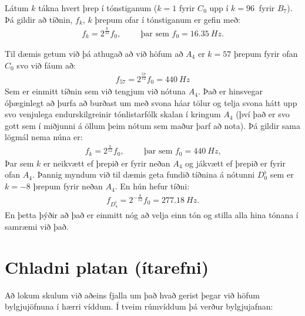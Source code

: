\begin{tcolorbox}
\begin{theorem}
Látum $k$ tákna hvert þrep í tónstiganum ($k = 1$ fyrir $C_0$ upp í $k = \SI{96}{}$ fyrir $B_7$). Þá gildir að tíðnin, $f_k$, $k$ þrepum ofar í tónstiganum er gefin með:
\begin{align*}
    f_k = 2^{\frac{k}{12}} f_0, \hspace{1cm} \text{þar sem $f_0 = \SI{16.35}{Hz}$.}
\end{align*}
\end{theorem}
\end{tcolorbox}

Til dæmis getum við þá athugað að við höfum að $A_4$ er $k = 57$ þrepum fyrir ofan $C_0$ svo við fáum að:
\begin{align*}
    f_{57} = 2^{\frac{57}{12}} f_0 = \SI{440}{Hz}
\end{align*}
Sem er einmitt tíðnin sem við tengjum við nótuna $A_4$. Það er hinsvegar óþæginlegt að þurfa að burðast um með svona háar tölur og telja svona hátt upp svo venjulega endurskilgreinir tónlistarfólk skalan í kringum $A_4$ (því það er svo gott sem í miðjunni á öllum þeim nótum sem maður þarf að nota). Þá gildir sama lögmál nema núna er:
\begin{align*}
    f_k = 2^{\frac{k}{12}}f_0, \hspace{1cm} \text{þar sem $f_0 = \SI{440}{Hz}$,}
\end{align*}
Þar sem $k$ er neikvætt ef þrepið er fyrir neðan $A_4$ og jákvætt ef þrepið er fyrir ofan $A_4$. Þannig myndum við til dæmis geta fundið tíðnina á nótunni $D^\flat_0$ sem er $k = -8$ þrepum fyrir neðan $A_4$. En hún hefur tíðni:
\begin{align*}
    f_{D^\flat_4} = 2^{-\frac{8}{12}} f_0 = \SI{277.18}{Hz}.
\end{align*}
En þetta þýðir að það er einmitt nóg að velja einn tón og stilla alla hina tónana í samræmi við það.


\newpage 

\section{Chladni platan (ítarefni)}

Að lokum skulum við aðeins fjalla um það hvað gerist þegar við höfum bylgjujöfnuna í hærri víddum. Í tveim rúmvíddum þá verður bylgjujafnan:

